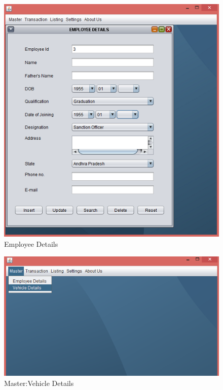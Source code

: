 \begin{figure}[ht]
\begin{center}
\includegraphics[scale=0.5]{images/image17.png}
\end{center}
\caption{Employee Details}
\label{Employee Details}
\end{figure}

\begin{figure}[ht]
\begin{center}
\includegraphics[scale=0.5]{images/image18.png}
\end{center}
\caption{Master:Vehicle Details}
\label{Master:Vehicle Details}
\end{figure}

